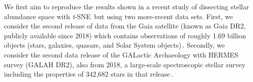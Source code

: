 \documentclass[sagev,Afour,times]{sagej}
\begin{document}

We first aim to reproduce the results shown in a recent study of dissecting stellar abundance space with \emph{t}-SNE\,\cite{tsne:astro} but using two more-recent data sets. First, we consider the second release of data from the Gaia satellite (known as Gaia DR2, publicly available since 2018) which contains observations of roughly 1.69 billion objects (stars, galaxies, quasars, and Solar System objects)\,\cite{astro:GAIADR2_1,astro:GAIADR2_2}. Secondly, we consider the second data release of the GALactic Archaeology with HERMES survey (GALAH DR2), also from 2018, a large-scale spectroscopic stellar survey including the properties of 342,682 stars in that release\,\cite{astro:GALAHDR2}. 
\end{document}
